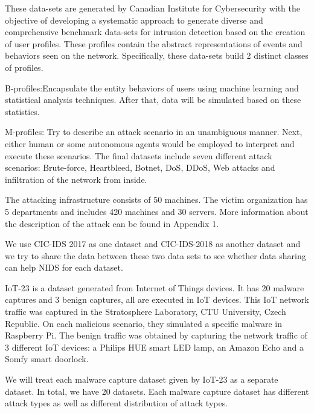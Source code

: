 \begin{background}
These data-sets are generated by Canadian Institute for Cybersecurity with the objective of developing a systematic approach to generate diverse and comprehensive benchmark data-sets for intrusion detection based on the creation of user profiles. These profiles contain the abstract representations of events and behaviors seen on the network. Specifically, these data-sets build 2 distinct classes of profiles. 

B-profiles:Encapsulate the entity behaviors of users using machine learning and statistical analysis  techniques. After that, data will be simulated based on these statistics.

M-profiles: Try to describe an attack scenario in an unambiguous manner. Next, either human or some autonomous agents would be employed to interpret and execute these scenarios. The final datasets include seven different attack scenarios: Brute-force, Heartbleed, Botnet, DoS, DDoS, Web attacks and infiltration of the network from inside. 

The attacking infrastructure consists of 50 machines. The victim organization has 5 departments and includes 420 machines and 30 servers. More information about the description of the attack can be found in Appendix 1.

We use CIC-IDS 2017 as one dataset and CIC-IDS-2018 as another dataset and we try to share the data between these two data sets to see whether data sharing can help NIDS for each dataset.

IoT-23 is a dataset generated from Internet of Things devices. It has 20 malware captures and 3 benign captures, all are executed in IoT devices. This IoT network traffic was captured in the Stratosphere Laboratory, CTU University, Czech Republic. On each malicious scenario, they simulated a specific malware in Raspberry Pi. The benign traffic was obtained by capturing the network traffic of 3 different IoT devices: a Philips HUE smart LED lamp, an Amazon Echo and a Somfy smart doorlock.

We will treat each malware capture dataset given by IoT-23 as a separate dataset. In total, we have 20 datasets. Each malware capture dataset has different attack types as well as different distribution of attack types.

\end{background}
